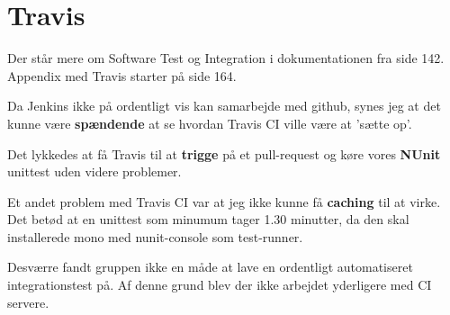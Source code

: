 \section{Travis}

Der står mere om Software Test og Integration i dokumentationen fra side 142. Appendix med Travis starter på side 164.

Da Jenkins ikke på ordentligt vis kan samarbejde med github, synes jeg at det kunne være \textbf{spændende} at se hvordan Travis CI ville være at 'sætte op'.

Det lykkedes at få Travis til at \textbf{trigge} på et pull-request og køre vores \textbf{NUnit} unittest uden videre problemer.

Et andet problem med Travis CI var at jeg ikke kunne få \textbf{caching} til at virke. Det betød at en unittest som minumum tager 1.30 minutter, da den skal installerede mono med nunit-console som test-runner.

Desværre fandt gruppen ikke en måde at lave en ordentligt automatiseret integrationstest på. Af denne grund blev der ikke arbejdet yderligere med CI servere.